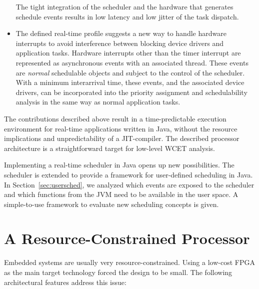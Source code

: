 \begin{itemize}
The tight integration of the scheduler and the hardware that
generates schedule events results in low latency and low jitter of
the task dispatch.

    \item
%
The defined real-time profile suggests a new way to handle hardware
interrupts to avoid interference between blocking device drivers and
application tasks. Hardware interrupts other than the timer
interrupt are represented as asynchronous events with an associated
thread. These events are \emph{normal} schedulable objects and
subject to the control of the scheduler. With a minimum interarrival
time, these events, and the associated device drivers, can be
incorporated into the priority assignment and schedulability
analysis in the same way as normal application tasks.

\end{itemize}

The contributions described above result in a time-predictable
execution environment for real-time applications written in Java,
without the resource implications and unpredictability of a
JIT-compiler. The described processor architecture is a
straightforward target for low-level WCET analysis.


Implementing a real-time scheduler in Java opens up new
possibilities. The scheduler is extended to provide a framework for
user-defined scheduling in Java. In Section~\ref{sec:usersched}, we
analyzed which events are exposed to the scheduler and which
functions from the JVM need to be available in the user space. A
simple-to-use framework to evaluate new scheduling concepts is
given.



\section{A Resource-Constrained Processor}

Embedded systems are usually very resource-constrained. Using a
low-cost FPGA as the main target technology forced the design to be
small. The following architectural features address this issue:

